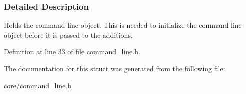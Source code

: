 \subsubsection{Detailed Description}
Holds the command line object. This is needed to initialize the command line object before it is passed to the additions. 

Definition at line 33 of file command\+\_\+line.\+h.



The documentation for this struct was generated from the following file\+:\begin{DoxyCompactItemize}
\item 
core/\hyperlink{command__line_8h}{command\+\_\+line.\+h}\end{DoxyCompactItemize}
